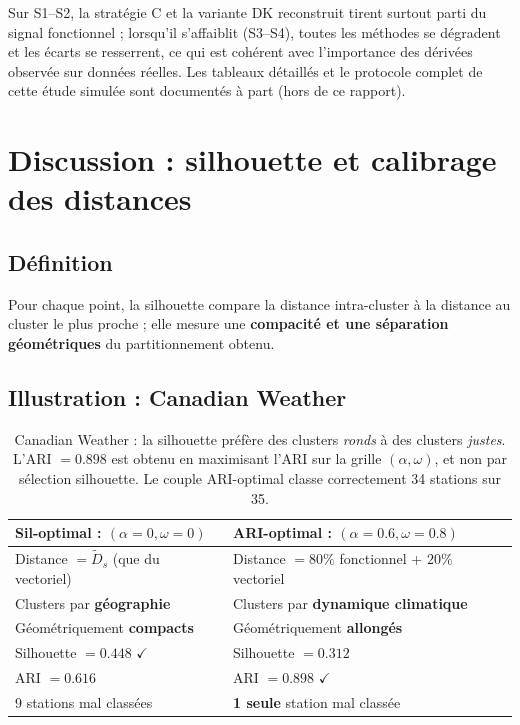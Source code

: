 \documentclass[11pt, a4paper]{article}
\begin{document}
Sur S1--S2, la stratégie C et la variante DK reconstruit tirent surtout parti
du signal fonctionnel ; lorsqu'il s'affaiblit (S3--S4), toutes les méthodes
se dégradent et les écarts se resserrent, ce qui est cohérent avec l'importance des
dérivées observée sur données réelles. Les tableaux détaillés et le protocole
complet de cette étude simulée sont documentés à part (hors de ce rapport).

\newpage
\section{Discussion : silhouette et calibrage des distances}

\subsection{Définition}

Pour chaque point, la silhouette compare la distance intra-cluster à la
distance au cluster le plus proche ; elle mesure une \textbf{compacité et une
séparation géométriques} du partitionnement obtenu.

\subsection{Illustration : Canadian Weather}

\begin{table}[H]
\centering
\renewcommand{\arraystretch}{1.3}
\begin{tabular}{p{5.5cm} p{5.5cm}}
  \toprule
  \textbf{Sil-optimal : $(\alpha{=}0, \omega{=}0)$} &
  \textbf{ARI-optimal : $(\alpha{=}0.6, \omega{=}0.8)$} \\
  \midrule
  Distance $= \tilde{D}_s$ (que du vectoriel) &
  Distance $= 80\%$ fonctionnel + $20\%$ vectoriel \\[4pt]
  Clusters par \textbf{géographie} &
  Clusters par \textbf{dynamique climatique} \\[4pt]
  Géométriquement \textbf{compacts} &
  Géométriquement \textbf{allongés} \\[4pt]
  Silhouette $= 0.448$ \textcolor{mix}{$\boldsymbol{\checkmark}$} &
  Silhouette $= 0.312$ \\[4pt]
  ARI $= 0.616$ &
  ARI $= 0.898$ \textcolor{mix}{$\boldsymbol{\checkmark}$} \\[2pt]
  \small 9 stations mal classées &
  \small \textbf{1 seule} station mal classée \\
  \bottomrule
\end{tabular}
\caption{Canadian Weather : la silhouette préfère des clusters \emph{ronds}
à des clusters \emph{justes}. L'ARI $= 0.898$ est obtenu en maximisant l'ARI
sur la grille $(\alpha, \omega)$, et non par sélection silhouette. Le couple
ARI-optimal classe correctement 34 stations sur 35.}
\end{table}
\end{document}
